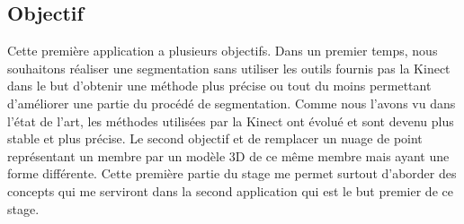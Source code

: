 \subsection{Objectif}
Cette première application a plusieurs objectifs. Dans un premier temps, nous souhaitons réaliser 
une segmentation sans utiliser les outils fournis pas la Kinect dans le but d'obtenir une méthode plus
précise ou tout du moins permettant d'améliorer une partie du procédé de segmentation. Comme nous l'avons vu dans 
l'état de l'art, les méthodes utilisées par la Kinect ont évolué et sont devenu plus stable et plus précise.
Le second objectif et de remplacer un nuage de point représentant un membre par un modèle 3D de ce même membre
mais ayant une forme différente. Cette première partie du stage me permet surtout d'aborder des concepts qui me 
serviront dans la second application qui est le but premier de ce stage.

